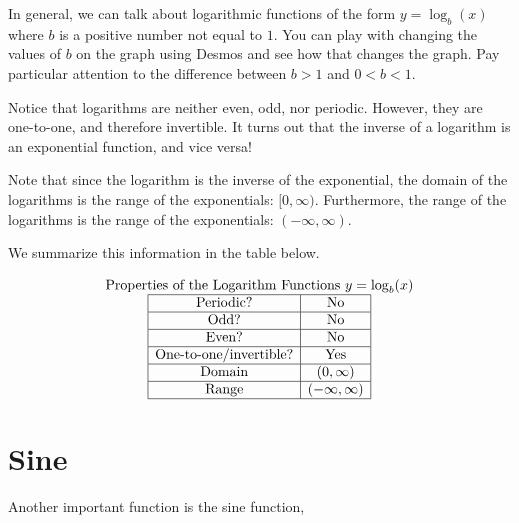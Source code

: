 \documentclass[nooutcomes]{ximera}
\begin{document}
In general, we can talk about logarithmic functions of the form $y=\log_b(x)$ where $b$ is a positive number not equal to $1$.  You can play with changing the values of $b$ on the graph using Desmos and see how that changes the graph.  Pay particular attention to the difference between $b>1$ and $0<b<1$.

\begin{center}  
\end{center}

Notice that logarithms are neither even, odd, nor periodic. However, they are one-to-one, and therefore invertible. It turns out that the inverse of a logarithm is an exponential function, and vice versa! 

Note that since the logarithm is the inverse of the exponential, the domain of the logarithms is the range of the exponentials: $[0, \infty)$. Furthermore, the range of the logarithms is the range of the exponentials: $(-\infty, \infty)$. 

We summarize this information in the table below.

\[
\begin{array}{ c  }
  \text{\normalfont Properties of the Logarithm Functions } y=\log_b(x)\\
 \begin{array}{|c|c|}
 \hline
\text{Periodic?} & \text{No} \\ \hline
\text{Odd?} & \text{No} \\ \hline
\text{Even?} & \text{No} \\ \hline
\text{One-to-one/invertible?} & \text{Yes} \\ \hline
\text{Domain} & (0,\infty)\\ \hline
\text{Range} & (-\infty,\infty)\\ \hline
 \end{array}
\end{array}
 \]


\newpage


\section{Sine}
Another important function is the sine function, 

\begin{center}
\end{center}
\end{document}

